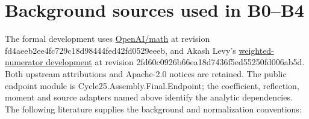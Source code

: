 \documentclass[11pt,a4paper]{article}
\newcommand{\sourcecode}[1]{{\small\ttfamily #1}}
\begin{document}
\hypertarget{background-sources-used-in-b0b4}{%
\section{Background sources used in
B0--B4}\label{background-sources-used-in-b0b4}}

The formal development uses
\href{https://github.com/openai/math/tree/fd4aeeb2ee4fc729c18d98444fed42fd0529eeeb}{OpenAI/math}
at revision \sourcecode{fd4aeeb2\allowbreak{}ee4fc729\allowbreak{}c18d9844\allowbreak{}4fed42fd\allowbreak{}0529eeeb}, and Akash
Levy's
\href{https://github.com/akashlevy/QuasiRiemannTracker/tree/2fd60c0926b66ea18d7436f5ed55250fd006ab5d}{weighted-numerator
development} at revision
\sourcecode{2fd60c09\allowbreak{}26b66ea1\allowbreak{}8d7436f5\allowbreak{}ed55250f\allowbreak{}d006ab5d}. Both upstream
attributions and Apache-2.0 notices are retained. The public endpoint
module is \sourcecode{Cycle25.\allowbreak{}Assembly.\allowbreak{}Final.\allowbreak{}Endpoint}; the coefficient,
reflection, moment and source adapters named above identify the analytic
dependencies. The following literature supplies the background and
normalization conventions:
\end{document}
